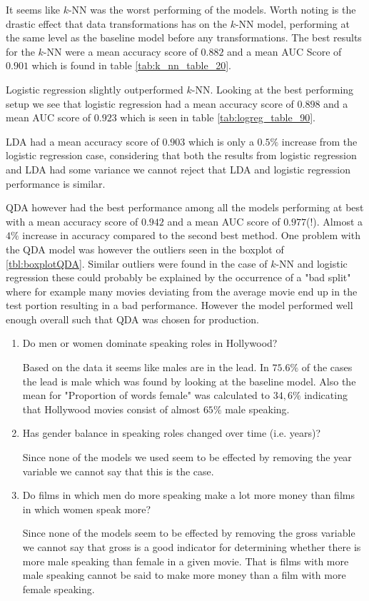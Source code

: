 \documentclass[../../project.tex]{subfiles}
\begin{document}
	It seems like $k$-NN was the worst performing of the models. Worth noting is the drastic effect that data transformations has on the $k$-NN model, performing at the same level as the baseline model before any transformations. The best results for the $k$-NN were a mean accuracy score of $0.882$ and a mean AUC Score of $0.901$ which is found in table \ref{tab:k_nn_table_20}.
	
	Logistic regression slightly outperformed $k$-NN. Looking at the best performing setup we see that logistic regression had a mean accuracy score of $0.898$ and a mean AUC score of $0.923$ which is seen in table \ref{tab:logreg_table_90}.  
	
	LDA had a mean accuracy score of $0.903$ which is only a $0.5\%$ increase from the logistic regression case, considering that both the results from logistic regression and LDA had some variance we cannot reject that LDA and logistic regression performance is similar.
	
	QDA however had the best performance among all the models performing at best with a mean accuracy score of $0.942$ and a mean AUC score of $0.977$(!). Almost a $4\%$ increase in accuracy compared to the second best method. One problem with the QDA model was however the outliers seen in the boxplot of \ref{tbl:boxplotQDA}. Similar outliers were found in the case of $k$-NN and logistic regression these could probably be explained by the occurrence of a "bad split" where for example many movies deviating from the average movie end up in the test portion resulting in a bad performance. However the model performed well enough overall such that QDA was chosen for production.
	
\begin{enumerate}
    \item Do men or women dominate speaking roles in Hollywood?
       
        Based on the data it seems like males are in the lead. In $75.6\%$ of the cases the lead is male which was found by looking at the baseline model. Also the mean for "Proportion of words female" was calculated to $34,6\%$ indicating that Hollywood movies consist of almost $65\%$ male speaking.
    \item Has gender balance in speaking roles changed over time (i.e. years)?
        
        Since none of the models we used seem to be effected by removing the year variable we cannot say that this is the case.
    \item Do films in which men do more speaking make a lot more money than films in which women speak more? 
    
    Since none of the models seem to be effected by removing the gross variable we cannot say that gross is a good indicator for determining whether there is more male speaking than female in a given movie. That is films with more male speaking cannot be said to make more money than a film with more female speaking. 
    
\end{enumerate}
	
	
	
	
\end{document}
